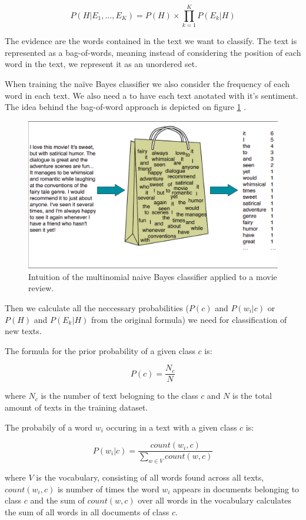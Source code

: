 $$P\left(H|E_{1},\ldots,E_{K}\right)=P(H)\times\prod_{k=1}^{K}P\left(E_{k}|H\right)$$


The evidence are the words contained in the text we want to classify. The text is represented as a bag-of-words, meaning instead of considering the position of each word in the text, we represent it as an unordered set.

When training the na\"ive Bayes classifier we also consider the frequency of each word in each text. We also need a to have each text anotated with it's sentiment. The idea behind the bag-of-word approach is depicted on figure \ref{img02:bof}
.
   \begin{figure}[htbp!]\centering
\includegraphics[width=.66\textwidth]{img/bagofwords}
      \caption{Intuition of the multinomial naive Bayes classifier applied to a movie review. \cite{bagofwords}}\label{img02:bof}
    \end{figure}


Then we calculate all the neccessary probabilities ($P(c)$ and $P(w_{i}|c)$ or $P(H)$ and $P(E_{k}|H)$ from the original formula) we need for classification of new texts.

The formula for the prior probability of a given class $c$ is:

$$P(c) = \frac{N_{c}}{N}$$

where $N_{c}$ is the number of text belogning to the class $c$ and $N$ is the total amount of texts in the training dataset.

The probabily of a word $w_{i}$ occuring in a text with a given class $c$ is:

$$ P(w_{i}|c) = \frac{count(w_{i},c)}{\sum_{w \in V} count(w,c)} $$

where $V$ is the vocabulary, consisting of all words found across all texts, $count(w_{i},c)$ is number of times the word $w_{i}$ appears in documents belonging to class $c$ and the sum of $count(w,c)$ over all words in the vocabulary calculates the sum of all words in all documents of class $c$.


